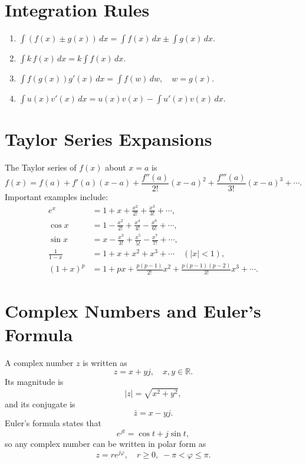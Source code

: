 \documentclass{article}
\begin{document}
\section{Integration Rules}
\begin{enumerate}
  \item \(\displaystyle \int (f(x)\pm g(x))\,dx=\int f(x)\,dx\pm\int g(x)\,dx\).
  \item \(\displaystyle \int k\,f(x)\,dx=k\int f(x)\,dx\).
  \item \(\displaystyle \int f(g(x))g'(x)\,dx=\int f(w)\,dw,\quad w=g(x)\).
  \item \(\displaystyle \int u(x)v'(x)\,dx = u(x)v(x)-\int u'(x)v(x)\,dx.\)
\end{enumerate}

\section{Taylor Series Expansions}
The Taylor series of \(f(x)\) about \(x=a\) is
\[
f(x)=f(a)+f'(a)(x-a)+\frac{f''(a)}{2!}(x-a)^2+\frac{f'''(a)}{3!}(x-a)^3+\cdots.
\]
Important examples include:
\begin{align*}
e^x &= 1+x+\frac{x^2}{2!}+\frac{x^3}{3!}+\cdots,\\[1ex]
\cos x &= 1-\frac{x^2}{2!}+\frac{x^4}{4!}-\frac{x^6}{6!}+\cdots,\\[1ex]
\sin x &= x-\frac{x^3}{3!}+\frac{x^5}{5!}-\frac{x^7}{7!}+\cdots,\\[1ex]
\frac{1}{1-x} &= 1+x+x^2+x^3+\cdots\quad(|x|<1),\\[1ex]
(1+x)^p &= 1+px+\frac{p(p-1)}{2!}x^2+\frac{p(p-1)(p-2)}{3!}x^3+\cdots.
\end{align*}

\section{Complex Numbers and Euler's Formula}
A complex number \(z\) is written as
\[
z=x+yj,\quad x,y\in\mathbb{R}.
\]
Its magnitude is
\[
|z|=\sqrt{x^2+y^2},
\]
and its conjugate is
\[
\bar{z}=x-yj.
\]
Euler's formula states that
\[
e^{jt}=\cos t+j\sin t,
\]
so any complex number can be written in polar form as
\[
z=re^{j\varphi},\quad r\ge0,\; -\pi<\varphi\le \pi.
\]
\end{document}

